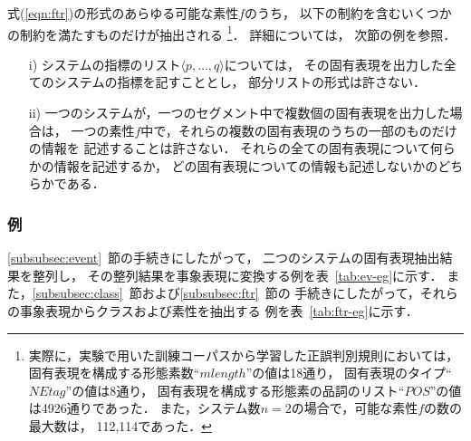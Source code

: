 式(\ref{eqn:ftr})の形式のあらゆる可能な素性$f$のうち，
以下の制約を含むいくつかの制約を満たすものだけが抽出される
\footnote{
  実際に，実験で用いた訓練コーパスから学習した正誤判別規則においては，
  固有表現を構成する形態素数``$mlength$''の値は18通り，
  固有表現のタイプ``$NEtag$''の値は8通り，
  固有表現を構成する形態素の品詞のリスト``$POS$''の値は4926通りであった．
  また，システム数$n\!=\!2$の場合で，可能な素性$f$の数の最大数は，
  112,114であった．
}． 
詳細については，
次節の例を参照．
\begin{enumerate}
\item[i)]	
  システムの指標のリスト$\langle p,\ldots,q\rangle$については，
  その固有表現を出力した全てのシステムの指標を記すこととし，
  部分リストの形式は許さない．
\item[ii)]
  一つのシステムが，一つのセグメント中で複数個の固有表現を出力した場合は，
  一つの素性$f$中で，それらの複数の固有表現のうちの一部のものだけの情報を
  記述することは許さない．
  それらの全ての固有表現について何らかの情報を記述するか，
  どの固有表現についての情報も記述しないかのどちらかである．
\end{enumerate}


\subsubsection{例}
\label{subsubsec:comb-eg}

\ref{subsubsec:event}~節の手続きにしたがって，
二つのシステムの固有表現抽出結果を整列し，
その整列結果を事象表現に変換する例を表~\ref{tab:ev-eg}に示す．
また，\ref{subsubsec:class}~節および\ref{subsubsec:ftr}~節の
手続きにしたがって，それらの事象表現からクラスおよび素性を抽出する
例を表~\ref{tab:ftr-eg}に示す．

